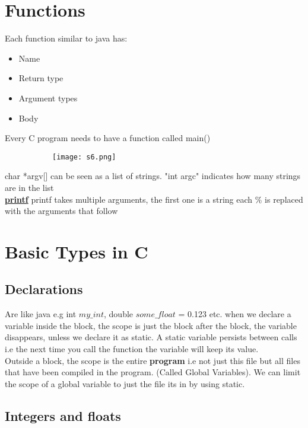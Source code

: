 \documentclass[8pt]{extreport}
\begin{document}
\section{Functions}
Each function similar to java has:
\begin{itemize}
\item Name
\item Return type
\item Argument types
\item Body
\end{itemize}
Every C program needs to have a function called main()
\begin{figure}[H]
\centering
\begin{subfigure}[b]{0.4\linewidth}
\texttt{[image: s6.png]}
\end{subfigure}
\end{figure}
char *argv[] can be seen as a list of strings. "int argc" indicates how many strings are in the list
\\
\underline{\textbf{printf}} printf takes multiple arguments, the first one is a string each $\%$ is replaced with the arguments that follow

\section{Basic Types in C}

\subsection{Declarations}
Are like java e.g int $my\_int$, double $some\_float$ = 0.123 etc.
when we declare a variable inside the block, the scope is just the block after the block, the variable disappears, unless we declare it as static. A static variable persists between calls i.e the next time you call the function the variable will keep its value.\\
Outside a block, the scope is the entire \textbf{program} i.e not just this file but all files that have been compiled in the program. (Called Global Variables). We can limit the scope of a global variable to just the file its in by using static.

\subsection{Integers and floats}
\end{document}
